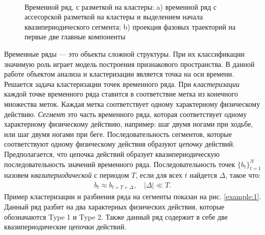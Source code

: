 \begin{figure}[h!t]\center
{}
\\
\caption{Временной ряд, с разметкой на кластеры: a) временной ряд с ассесорской разметкой на кластеры и выделением начала квазипериодического сегмента; b) проекция фазовых траекторий на первые две главные компоненты}
\end{figure}

Временные ряды --- это объекты сложной структуры. 
При их классификации значимую роль играет модель построения признакового пространства.
В данной работе объектом анализа и кластеризации является точка на оси времени. 
Решается задача кластеризации точек временного ряда. 
При \textit{кластеризации} каждой точке временного ряда ставится в соответствие метка из конечного множества меток. 
Каждая метка соответствует одному характерному физическому действию. \textit{Сегмент} это часть временного ряда, которая соответствует одному характерному физическому действию, например: шаг двумя ногами при ходьбе, или шаг двумя ногами при беге.
Последовательность сегментов, которые соответствуют одному физическому действия образуют \textit{цепочку} действий. 
Предполагается, что цепочка действий образует квазипериодическую последовательность значений временного ряда.
Последовательность точек $\{b_t\}_{t=1}^{N}$ назовем \textit{квазипериодической} с периодом $T$, если для всех $t$ найдется $\Delta$, такое что:
\[
\label{eq:int:1}
\begin{aligned}
b_t \approx b_{t+T+\Delta}, \quad \left|\Delta\right| \ll T.
\end{aligned}
\]
Пример кластеризации и разбиения ряда на сегменты показан на рис. \ref{example:1}. Данный ряд разбит на два характерных физических действия, которые обозначаются Type 1 и Type 2. Также данный ряд содержит в себе две квазипериодические цепочки действий.

